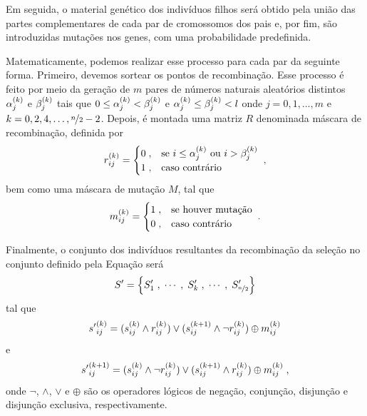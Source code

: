 Em seguida, o material genético dos indivíduos filhos será obtido pela união das partes complementares
de cada par de cromossomos dos pais e, por fim, são introduzidas mutações nos genes, com uma probabilidade predefinida.



Matematicamente, podemos realizar esse processo para cada par da seguinte forma. Primeiro, devemos
sortear os pontos de recombinação. Esse processo é feito por meio da geração de $m$ pares
de números naturais aleatórios distintos $ {\alpha}^{(k)}_{j} $ e $ {\beta}^{(k)}_{j} $ tais que
$ 0 \leq {\alpha}^{(k)}_{j} < {\beta}^{(k)}_{j} $ e $ {\alpha}^{(k)}_{j} \leq {\beta}^{(k)}_{j} < l $ onde
$ j = 0, 1, \dots, m $ e $ k = 0, 2, 4, \dots, \nicefrac{n}{2} - 2 $.
Depois, é montada uma matriz $R$ denominada máscara de recombinação, definida por
\begin{equation}
  {r}^{(k)}_{ij} =
  \begin{cases}
    0 \;, & \text{se } i \leq {\alpha}^{(k)}_{j} \text{ ou } i > {\beta}^{(k)}_{j} \\
    1 \;, & \text{caso contrário}
  \end{cases}
  \;\mathrm{,}
\end{equation}
bem como uma máscara de mutação $M$, tal que
\begin{equation}
  {m}^{(k)}_{ij} =
  \begin{cases}
    1 \;, & \text{se houver mutação} \\
    0 \;, & \text{caso contrário}
  \end{cases}
  \;\mathrm{.}
\end{equation}

Finalmente, o conjunto dos indivíduos resultantes da recombinação da seleção no conjunto definido
pela Equação  será
\begin{equation}
  S' = \left\{ S'_1\;, \;\cdots\;,  \;S'_k\;, \;\cdots\;, \;S'_{\nicefrac{n}{2}} \right\}
\end{equation}
tal que
\begin{equation}
  {s'}^{(k)}_{ij} = ({s}^{(k)}_{ij} \land {r}^{(k)}_{ij}) \lor ({s}^{(k + 1)}_{ij} \land \lnot {r}^{(k)}_{ij}) \oplus {m}^{(k)}_{ij}
\end{equation}
e
\begin{equation}
  {s'}^{(k + 1)}_{ij} = ({s}^{(k)}_{ij} \land \lnot {r}^{(k)}_{ij}) \lor ({s}^{(k + 1)}_{ij} \land {r}^{(k)}_{ij}) \oplus {m}^{(k)}_{ij} \;\mathrm{,}
\end{equation}
onde $\lnot$, $\land$, $\lor$ e $\oplus$ são os operadores lógicos de negação, conjunção, disjunção e disjunção exclusiva,
respectivamente.

